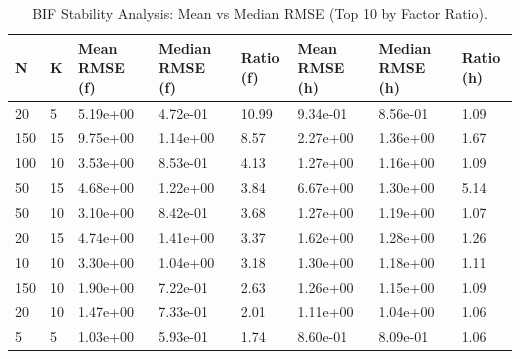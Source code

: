 \begin{table}
\caption{BIF Stability Analysis: Mean vs Median RMSE (Top 10 by Factor Ratio).}
\label{tab:bif_stability}
\begin{tabular}{llllllll}
\toprule
N & K & Mean RMSE (f) & Median RMSE (f) & Ratio (f) & Mean RMSE (h) & Median RMSE (h) & Ratio (h) \\
\midrule
20 & 5 & 5.19e+00 & 4.72e-01 & 10.99 & 9.34e-01 & 8.56e-01 & 1.09 \\
150 & 15 & 9.75e+00 & 1.14e+00 & 8.57 & 2.27e+00 & 1.36e+00 & 1.67 \\
100 & 10 & 3.53e+00 & 8.53e-01 & 4.13 & 1.27e+00 & 1.16e+00 & 1.09 \\
50 & 15 & 4.68e+00 & 1.22e+00 & 3.84 & 6.67e+00 & 1.30e+00 & 5.14 \\
50 & 10 & 3.10e+00 & 8.42e-01 & 3.68 & 1.27e+00 & 1.19e+00 & 1.07 \\
20 & 15 & 4.74e+00 & 1.41e+00 & 3.37 & 1.62e+00 & 1.28e+00 & 1.26 \\
10 & 10 & 3.30e+00 & 1.04e+00 & 3.18 & 1.30e+00 & 1.18e+00 & 1.11 \\
150 & 10 & 1.90e+00 & 7.22e-01 & 2.63 & 1.26e+00 & 1.15e+00 & 1.09 \\
20 & 10 & 1.47e+00 & 7.33e-01 & 2.01 & 1.11e+00 & 1.04e+00 & 1.06 \\
5 & 5 & 1.03e+00 & 5.93e-01 & 1.74 & 8.60e-01 & 8.09e-01 & 1.06 \\
\bottomrule
\end{tabular}
\end{table}
